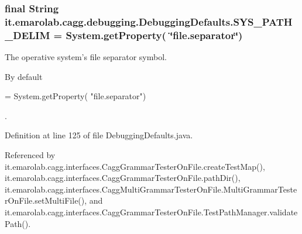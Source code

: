 \hypertarget{classit_1_1emarolab_1_1cagg_1_1debugging_1_1DebuggingDefaults_a7c9d7fb448feba26f1848cd81cedbc3f}{
\subsubsection[{S\-Y\-S\-\_\-\-P\-A\-T\-H\-\_\-\-D\-E\-L\-I\-M}]{\setlength{\rightskip}{0pt plus 5cm}final String it.\-emarolab.\-cagg.\-debugging.\-Debugging\-Defaults.\-S\-Y\-S\-\_\-\-P\-A\-T\-H\-\_\-\-D\-E\-L\-I\-M = System.\-get\-Property( \char`\"{}file.\-separator\char`\"{})\hspace{0.3cm}{\ttfamily [static]}}}\label{classit_1_1emarolab_1_1cagg_1_1debugging_1_1DebuggingDefaults_a7c9d7fb448feba26f1848cd81cedbc3f}
The operative system's file separator symbol.\par
 By default
\begin{DoxyCode}
= System.getProperty( \textcolor{stringliteral}{"file.separator"}) 
\end{DoxyCode}
 . 

Definition at line 125 of file Debugging\-Defaults.\-java.



Referenced by it.\-emarolab.\-cagg.\-interfaces.\-Cagg\-Grammar\-Tester\-On\-File.\-create\-Test\-Map(), it.\-emarolab.\-cagg.\-interfaces.\-Cagg\-Grammar\-Tester\-On\-File.\-path\-Dir(), it.\-emarolab.\-cagg.\-interfaces.\-Cagg\-Multi\-Grammar\-Tester\-On\-File.\-Multi\-Grammar\-Tester\-On\-File.\-set\-Multi\-File(), and it.\-emarolab.\-cagg.\-interfaces.\-Cagg\-Grammar\-Tester\-On\-File.\-Test\-Path\-Manager.\-validate\-Path().

